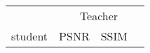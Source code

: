 \documentclass[letterpaper]{article} \usepackage{aaai23}  \usepackage{times}  \usepackage{helvet}  \usepackage{courier}  \usepackage[hyphens]{url}  \usepackage{graphicx} \urlstyle{rm} \def\UrlFont{\rm}  \usepackage{natbib}  \usepackage{caption} \frenchspacing  \setlength{\pdfpagewidth}{8.5in}  \setlength{\pdfpageheight}{11in}  \usepackage{multirow}
\begin{document}
\begin{table*}[t]
\centering
\begin{tabular}{c|cccccccccccc}
\hline
                         & \multicolumn{12}{c}{Teacher}                                                                                                                                                                                                                                                                                                                                                                                                                                                                                                                                                                                                                                                                                             \\ \cline{2-13} 
\multirow{2}{*}{student} & \multicolumn{4}{c|}{PSNR}                                                                                                                                                                                                                     & \multicolumn{4}{c|}{SSIM}                                                                                                                                                                                                                     & \multicolumn{4}{c}{}                                                                                                                                                                                           \\

\end{tabular}
\end{table*}
\end{document}
